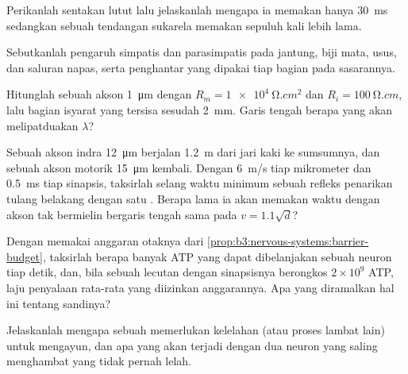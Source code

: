 \begin{exercise}[$\star$]\label{exo:b3:nervous-systems:3}
Perikanlah  sentakan lutut lalu jelaskanlah mengapa ia memakan
hanya \qty{30}{ms} sedangkan sebuah tendangan sukarela memakan sepuluh kali lebih lama.
\end{exercise}

\begin{exercise}[$\star$]\label{exo:b3:nervous-systems:4}
Sebutkanlah pengaruh simpatis dan parasimpatis pada jantung,
biji mata, usus, dan saluran napas, serta penghantar yang dipakai tiap bagian
pada sasarannya.
\end{exercise}

\begin{exercise}[$\star\star$]\label{exo:b3:nervous-systems:5}
Hitunglah  sebuah akson \qty{1}{\micro m} dengan $R_{m}
= \qty{1e4}{\ohm.cm^2}$ dan $R_{i} = \qty{100}{\ohm.cm}$, lalu
bagian isyarat yang tersisa sesudah \qty{2}{mm}. Garis tengah berapa yang akan
melipatduakan $\lambda$?
\end{exercise}

\begin{exercise}[$\star\star$]\label{exo:b3:nervous-systems:6}
Sebuah akson indra \qty{12}{\micro m} berjalan \qty{1.2}{m} dari jari kaki ke
sumsumnya, dan sebuah akson motorik \qty{15}{\micro m} kembali. Dengan
\qty{6}{m/s} tiap mikrometer dan \qty{0.5}{ms} tiap sinapsis, taksirlah
selang waktu minimum sebuah refleks penarikan tulang belakang dengan satu .
Berapa lama ia akan memakan waktu dengan akson tak bermielin bergaris tengah sama pada
$v = 1.1\sqrt{d}$?
\end{exercise}

\begin{exercise}[$\star\star$]\label{exo:b3:nervous-systems:7}
Dengan memakai anggaran otaknya dari
\cref{prop:b3:nervous-systems:barrier-budget}, taksirlah berapa banyak ATP yang
dapat dibelanjakan sebuah neuron tiap detik, dan, bila sebuah lecutan dengan
sinapsisnya berongkos $2\times 10^{9}$ ATP, laju penyalaan rata-rata yang
diizinkan anggarannya. Apa yang diramalkan hal ini tentang sandinya?
\end{exercise}

\begin{exercise}[$\star\star$]\label{exo:b3:nervous-systems:8}
Jelaskanlah mengapa sebuah  memerlukan kelelahan (atau
proses lambat lain) untuk mengayun, dan apa yang akan terjadi dengan dua neuron
yang saling menghambat yang tidak pernah lelah.
\end{exercise}

